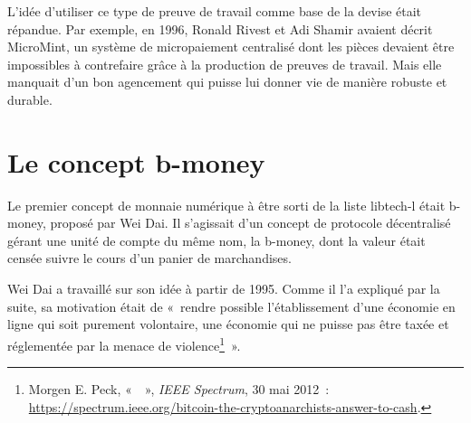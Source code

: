 
L'idée d'utiliser ce type de preuve de travail comme base de la devise était répandue. Par exemple, en 1996, Ronald Rivest et Adi Shamir avaient décrit MicroMint, un système de micropaiement centralisé dont les pièces devaient être impossibles à contrefaire grâce à la production de preuves de travail. Mais elle manquait d'un bon agencement qui puisse lui donner vie de manière robuste et durable.

\section*{Le concept b-money} %

Le premier concept de monnaie numérique à être sorti de la liste libtech-l était b-money, proposé par Wei Dai. Il s'agissait d'un concept de protocole décentralisé gérant une unité de compte du même nom, la b-money, dont la valeur était censée suivre le cours d'un panier de marchandises.

Wei Dai a travaillé sur son idée à partir de 1995. Comme il l'a expliqué par la suite, sa motivation était de «~rendre possible l'établissement d'une économie en ligne qui soit purement volontaire, une économie qui ne puisse pas être taxée et réglementée par la menace de violence\footnote{Morgen E. Peck, «~~», \emph{IEEE Spectrum}, 30 mai 2012~: \url{https://spectrum.ieee.org/bitcoin-the-cryptoanarchists-answer-to-cash}.}~». %

